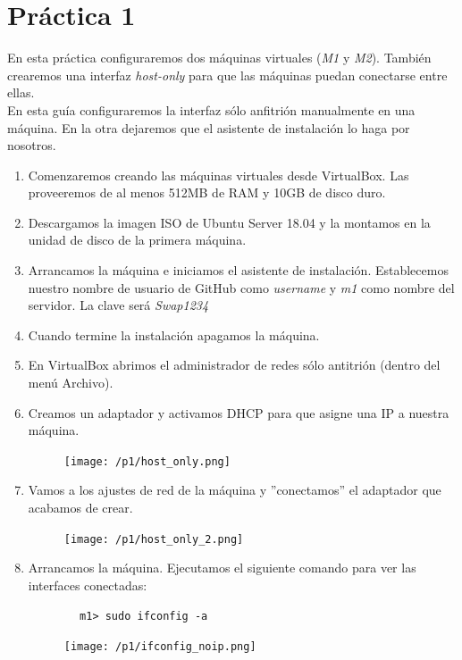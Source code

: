 \documentclass[12pt,spanish]{article}
\begin{document}
\section{Práctica 1}

En esta práctica configuraremos dos máquinas virtuales (\textit{M1} y \textit{M2}). También crearemos una interfaz \emph{host-only} para que las máquinas puedan conectarse entre ellas. \\

En esta guía configuraremos la interfaz sólo anfitrión manualmente en una máquina. En la otra dejaremos que el asistente de instalación lo haga por nosotros.

\begin{enumerate}
	\item Comenzaremos creando las máquinas virtuales desde VirtualBox. Las proveeremos de al menos 512MB de RAM y 10GB de disco duro.
	\item Descargamos la imagen ISO de Ubuntu Server 18.04 y la montamos en la unidad de disco de la primera máquina.
	\item Arrancamos la máquina e iniciamos el asistente de instalación. Establecemos nuestro nombre de usuario de GitHub como \emph{username} y \emph{m1} como nombre del servidor. La clave será \emph{Swap1234}
	\item Cuando termine la instalación apagamos la máquina.
	\item En VirtualBox abrimos el administrador de redes sólo antitrión (dentro del menú Archivo).
	\item Creamos un adaptador y activamos DHCP para que asigne una IP a nuestra máquina.
	\begin{figure}[H]
		\centering
		\texttt{[image: /p1/host\_only.png]}
	\end{figure}
	\item Vamos a los ajustes de red de la máquina y ''conectamos'' el adaptador que acabamos de crear.
	\begin{figure}[H]
		\centering
		\texttt{[image: /p1/host\_only\_2.png]}
	\end{figure}
	\item Arrancamos la máquina. Ejecutamos el siguiente comando para ver las interfaces conectadas:
	\begin{lstlisting}
		m1> sudo ifconfig -a
	\end{lstlisting}
	\begin{figure}[H]
		\centering
		\texttt{[image: /p1/ifconfig\_noip.png]}
	\end{figure}

\end{enumerate}
\end{document}
